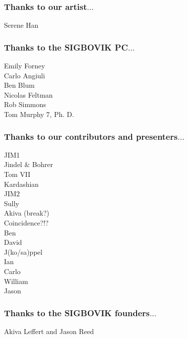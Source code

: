 \documentclass{beamer}
\begin{document}
\begin{frame}
\frametitle{Thanks to our artist$\dots$}
\large Serene Han
\end{frame}

\begin{frame}
\frametitle{Thanks to the SIGBOVIK PC$\dots$}
\large Emily Forney \\
Carlo Angiuli \\
Ben Blum \\
Nicolas Feltman \\
Rob Simmons \\
Tom Murphy 7, Ph. D.
\end{frame}

\begin{frame}
\frametitle{Thanks to our contributors and presenters$\dots$}
JIM1 \\
Jindel \& Bohrer \\
Tom VII \\
Kardashian \\
JIM2 \\
Sully \\
Akiva (break?) \\
Coincidence?!? \\
Ben \\
David \\
J(ko/sa)ppel \\
Ian \\
Carlo \\
William \\
Jason
\end{frame}

\begin{frame}
\frametitle{Thanks to the SIGBOVIK founders$\dots$}
\large Akiva Leffert and Jason Reed
\end{frame}
\end{document}
